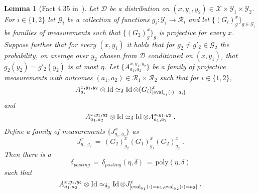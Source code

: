 \documentclass{book}
\theoremstyle{plain}
\newtheorem{lemma}[subsection]{Lemma}
\theoremstyle{definition}
\theoremstyle{remark}
\numberwithin{equation}{subsection}
\newcommand{\mH}{\mathcal{H}}
\newcommand{\Id}{\ensuremath{\mathop{\rm Id}\nolimits}}
\newcommand{\eval}{\mathrm{eval}}
\newcommand{\poly}{\mathrm{poly}}
\newcommand{\ket}[1]{|#1\rangle}
\newcommand{\alice}{A}
\newcommand{\bob}{B}
\newcommand{\abc}[1][\delta]{\otimes I_\bob \simeq_{#1} I_\alice \otimes}
\begin{document}
\begin{lemma}[Fact 4.35 in~\cite{NW19}]\label{lem:pasting}
Let $\mathcal{D}$ be a distribution on $(x,y_1,y_2)\in \mathcal{X}\times \mathcal{Y}_1\times \mathcal{Y}_2$. For $i\in \{1,2\}$ let $\mathcal{G}_i$ be a collection of functions $g_i: \mathcal{Y}_i \to \mathcal{R}_i$ and let $\{(G_i)^{x}_{g}\}_{g\in \mathcal{G}_i}$ be families of measurements such that $\{(G_2)^x_g\}_g$ is projective for every $x$. Suppose further that for every $(x,y_1)$ it holds that for $g_2\neq g'_2 \in \mathcal{G}_2$ the probability, on average over $y_2$ chosen from $\mathcal{D}$ conditioned on $(x,y_1)$, that $g_2(y_2)=g'_2(y_2)$  is at most $\eta$. 
Let $\{A^{x,y_1,y_2}_{a_1,a_2}\}$ be a family of projective measurements with outcomes $(a_1,a_2)\in \mathcal{R}_1 \times \mathcal{R}_2$ such that for $i\in \{1,2\}$,
\begin{equation}\label{eq:pasting-1}
 A^{x,y_1,y_2}_{a_i} \otimes \Id \simeq_\delta \Id \otimes (G_i)^x_{[\eval_{y_i}(\cdot)=a_i]}
\end{equation}
and 
\begin{equation}\label{eq:pasting-2}
 A^{x,y_1,y_2}_{a_1,a_2} \otimes \Id \simeq_\delta \Id \otimes  A^{x,y_1,y_2}_{a_1,a_2}\;.
\end{equation}
Define a family of measurements $\{J^x_{g_1,g_2}\}$ as
\begin{equation}\label{eq:pasting-2a}
 J^x_{g_1,g_2} \,=\, (G_2)^x_{g_2} (G_1)^x_{g_1} (G_2)^x_{g_2}\;.
\end{equation}
Then there is a 
\begin{equation}\label{eq:def-deltap}
\delta_{pasting} \,=\, \delta_{pasting}(\eta,\delta)\,=\, \poly(\eta,\delta)
\end{equation} such that 
\begin{equation}\label{eq:pasting-3}
 A^{x,y_1,y_2}_{a_1,a_2} \otimes \Id \simeq_{\delta_p} \Id \otimes J^x_{[\eval_{y_1}(\cdot)=a_1,\eval_{y_2}(\cdot) = a_2]}\;.
\end{equation}
\end{lemma}
%
%
\end{document}

